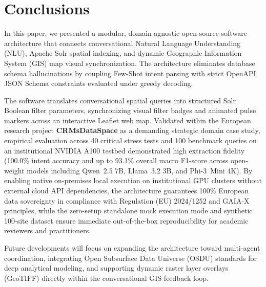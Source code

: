 \section{Conclusions}
\label{sec:Conclusions}

In this paper, we presented a modular, domain-agnostic open-source software architecture that connects conversational Natural Language Understanding (NLU), Apache Solr spatial indexing, and dynamic Geographic Information System (GIS) map visual synchronization. The architecture eliminates database schema hallucinations by coupling Few-Shot intent parsing with strict OpenAPI JSON Schema constraints evaluated under greedy decoding. 

The software translates conversational spatial queries into structured Solr Boolean filter parameters, synchronizing visual filter badges and animated pulse markers across an interactive Leaflet web map. Validated within the European research project \textbf{CRMsDataSpace} as a demanding strategic domain case study, empirical evaluation across 40 critical stress tests and 100 benchmark queries on an institutional NVIDIA A100 testbed demonstrated high extraction fidelity (100.0\% intent accuracy and up to 93.1\% overall macro F1-score across open-weight models including Qwen~2.5 7B, Llama~3.2 3B, and Phi-3~Mini 4K). By enabling native on-premises local execution on institutional GPU clusters without external cloud API dependencies, the architecture guarantees 100\% European data sovereignty in compliance with Regulation (EU) 2024/1252 and GAIA-X principles, while the zero-setup standalone mock execution mode and synthetic 100-site dataset ensure immediate out-of-the-box reproducibility for academic reviewers and practitioners.

Future developments will focus on expanding the architecture toward multi-agent coordination, integrating Open Subsurface Data Universe (OSDU) standards for deep analytical modeling, and supporting dynamic raster layer overlays (GeoTIFF) directly within the conversational GIS feedback loop.

